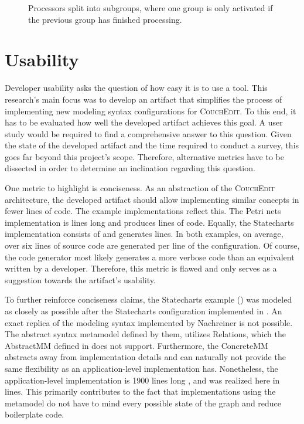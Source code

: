 \begin{figure}
  \centering
  
  \caption{Processors split into subgroups, where one group is only activated if the previous group has finished processing.}
  \label{fig:sub-groups}
\end{figure}

\section{Usability}
Developer usability asks the question of how easy it is to use a tool. This research's main focus was to develop an artifact that simplifies the process of implementing new modeling syntax configurations for \textsc{CouchEdit}. To this end, it has to be evaluated how well the developed artifact achieves this goal. A user study would be required to find a comprehensive answer to this question. Given the state of the developed artifact and the time required to conduct a survey, this goes far beyond this project's scope. Therefore, alternative metrics have to be dissected in order to determine an inclination regarding this question.

One metric to highlight is conciseness. As an abstraction of the \textsc{CouchEdit} architecture, the developed artifact should allow implementing similar concepts in fewer lines of code. The example implementations reflect this. The Petri nets implementation is \petriConfigLoC lines long and produces \petriGeneratedLoC lines of code. Equally, the Statecharts implementation consists of \stateConfigLoC and generates \stateGeneratedLoC lines. In both examples, on average, over six lines of source code are generated per line of the configuration. Of course, the code generator most likely generates a more verbose code than an equivalent written by a developer. Therefore, this metric is flawed and only serves as a suggestion towards the artifact's usability.

To further reinforce conciseness claims, the Statecharts example () was modeled as closely as possible after the Statecharts configuration implemented in \cite{nachreiner_couchedit_2020}. An exact replica of the modeling syntax implemented by Nachreiner is not possible. The abstract syntax metamodel defined by them, utilizes Relations, which the AbstractMM defined in  does not support. Furthermore, the ConcreteMM abstracts away from implementation details and can naturally not provide the same flexibility as an application-level implementation has.  Nonetheless, the application-level implementation is 1900 lines long \cite{nachreiner_couchedit_2020}, and was realized here in \stateConfigLoC lines. This primarily contributes to the fact that implementations using the metamodel do not have to mind every possible state of the graph and reduce boilerplate code.

